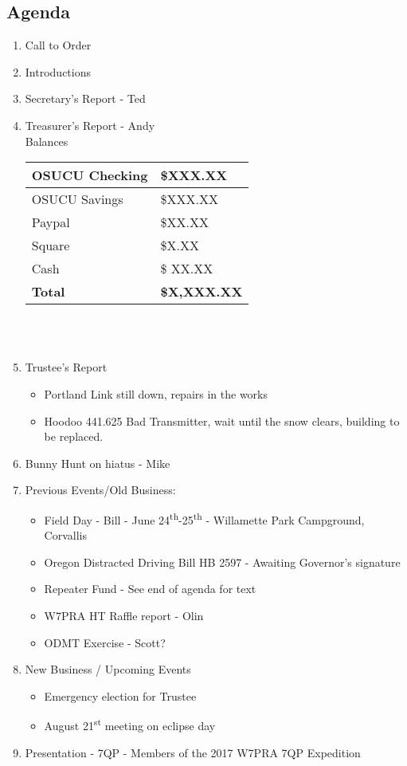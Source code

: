 \documentclass[letter,11pt]{extarticle}
\begin{document}
	\subsection*{Agenda}
	\begin{enumerate}
		\item Call to Order
		\item Introductions
		\item Secretary's Report - Ted
		\item Treasurer's Report - Andy \\
				Balances \\
			\begin{tabular}{|l|l|} \hline
				OSUCU Checking & \$XXX.XX \\ \hline
				OSUCU Savings & \$XXX.XX \\ \hline
				Paypal & \$XX.XX \\ \hline
				Square & \$X.XX \\ \hline
				Cash & \$ XX.XX \\ \hline
				\textbf{Total} & \textbf{\$X,XXX.XX} \\ \hline
			\end{tabular} \\ \\
		\item Trustee's Report
			\begin{itemize}
				\item Portland Link still down, repairs in the works
				\item Hoodoo 441.625 Bad Transmitter, wait until the snow clears, building to be replaced.		
			\end{itemize}
		\item Bunny Hunt on hiatus - Mike
		\item Previous Events/Old Business:
			\begin{itemize}
				\item Field Day - Bill - June 24\textsuperscript{th}-25\textsuperscript{th} - Willamette Park Campground, Corvallis
				\item Oregon Distracted Driving Bill HB 2597 - Awaiting Governor's signature
				\item Repeater Fund - See end of agenda for text
				\item W7PRA HT Raffle report - Olin
				\item ODMT Exercise - Scott?
			\end{itemize}
		\item  New Business / Upcoming Events
			\begin{itemize}
				\item Emergency election for Trustee
				\item August 21\textsuperscript{st} meeting on eclipse day
			\end{itemize}
		\item  Presentation - 7QP - Members of the 2017 W7PRA 7QP Expedition
	\end{enumerate}
\end{document}
